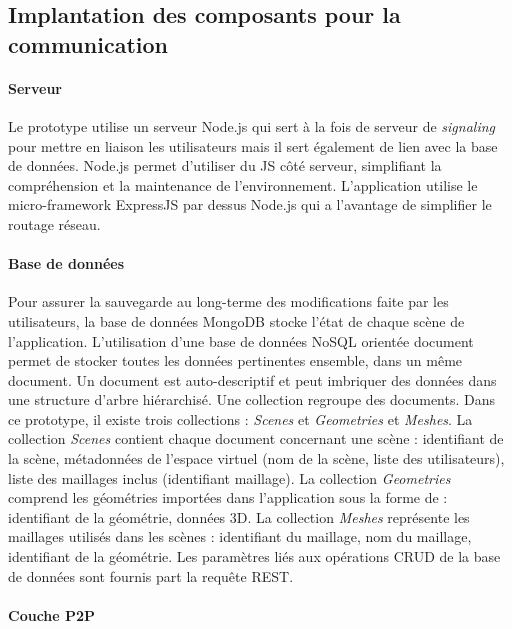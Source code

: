 \subsection{Implantation des composants pour la 
	communication}
		\paragraph{Serveur}
		
Le prototype utilise un serveur Node.js qui sert à la fois de serveur de 
\textit{signaling} pour mettre en liaison les utilisateurs mais il sert également 
de lien avec la base de données. Node.js permet d'utiliser du \gls{JS} côté 
serveur, simplifiant la compréhension et la maintenance de l'environnement. 
L'application utilise le micro-framework ExpressJS par dessus Node.js qui a 
l'avantage de simplifier le routage réseau.

		\paragraph{Base de données}

Pour assurer la sauvegarde au long-terme des modifications faite par les 
utilisateurs, la base de données MongoDB stocke l'état de chaque scène de 
l'application. L'utilisation d'une base de données NoSQL orientée document 
permet de stocker toutes les données pertinentes ensemble, dans un même 
document. Un document est auto-descriptif et peut imbriquer des données 
dans une structure d'arbre hiérarchisé. Une collection regroupe des 
documents. Dans ce prototype, il existe trois collections : \textit{Scenes} et 
\textit{Geometries} et \textit{Meshes}. 
La collection \textit{Scenes} contient chaque document concernant une 
scène : identifiant de la scène, métadonnées de l'espace virtuel (nom de la 
scène, liste des utilisateurs), liste des maillages inclus (identifiant maillage). 
La collection \textit{Geometries} comprend les géométries importées dans 
l'application sous la forme de : identifiant de la géométrie, données 3D.
La collection \textit{Meshes} représente les maillages utilisés dans les 
scènes : identifiant du maillage, nom du maillage, identifiant de la géométrie.
Les paramètres liés aux opérations \gls{CRUD} de la base de données sont 
fournis part la requête \gls{REST}. 

		\paragraph{Couche \gls{P2P}} 

